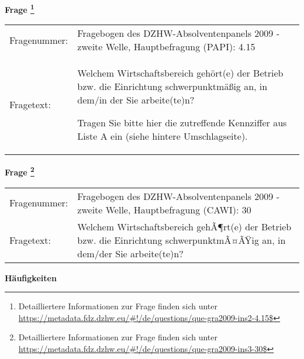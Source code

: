 				\vspace*{0.5cm}
                \noindent\textbf{Frage
	                \footnote{Detailliertere Informationen zur Frage finden sich unter
		              \url{https://metadata.fdz.dzhw.eu/\#!/de/questions/que-gra2009-ins2-4.15$}}}\\
				\begin{tabularx}{\hsize}{@{}lX}
					Fragenummer: &
					  Fragebogen des DZHW-Absolventenpanels 2009 - zweite Welle, Hauptbefragung (PAPI):
					  4.15
 \\
					Fragetext: & Welchem Wirtschaftsbereich gehört(e) der Betrieb bzw. die Einrichtung schwerpunktmäßig an, in dem/in der Sie arbeite(te)n?\par  Tragen Sie bitte hier die zutreffende Kennziffer aus Liste A ein (siehe hintere Umschlagseite). \\
				\end{tabularx}
				\vspace*{0.5cm}
                \noindent\textbf{Frage
	                \footnote{Detailliertere Informationen zur Frage finden sich unter
		              \url{https://metadata.fdz.dzhw.eu/\#!/de/questions/que-gra2009-ins3-30$}}}\\
				\begin{tabularx}{\hsize}{@{}lX}
					Fragenummer: &
					  Fragebogen des DZHW-Absolventenpanels 2009 - zweite Welle, Hauptbefragung (CAWI):
					  30
 \\
					Fragetext: & Welchem Wirtschaftsbereich gehÃ¶rt(e) der Betrieb bzw. die Einrichtung schwerpunktmÃ¤ÃŸig an, in dem/der Sie arbeite(te)n? \\
				\end{tabularx}





        		\vspace*{0.5cm}
                \noindent\textbf{Häufigkeiten}

